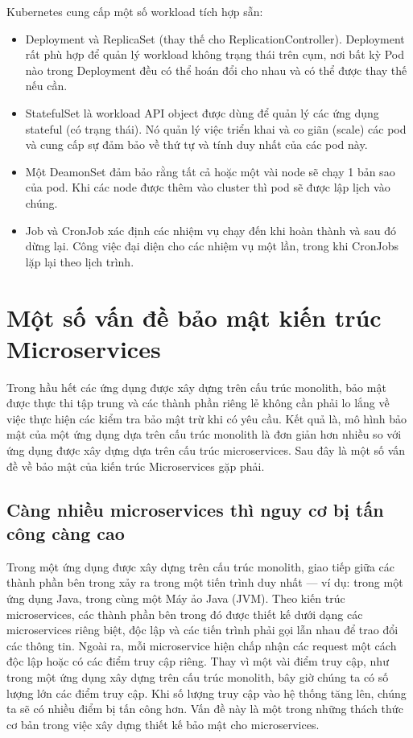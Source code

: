 \documentclass[12pt,a4paper]{report}
\begin{document}
				Kubernetes cung cấp một số workload tích hợp sẵn:
				\begin{itemize}				
					\item Deployment và ReplicaSet (thay thế cho ReplicationController). Deployment rất phù hợp để quản lý workload không trạng thái trên cụm, nơi bất kỳ Pod nào trong Deployment đều có thể hoán đổi cho nhau và có thể được thay thế nếu cần.
					\item StatefulSet là workload API object được dùng để quản lý các ứng dụng stateful (có trạng thái). Nó quản lý việc triển khai và co giãn (scale) các pod và cung cấp sự đảm bảo về thứ tự và tính duy nhất của các pod này.
					\item  Một DeamonSet đảm bảo rằng tất cả hoặc một vài node sẽ chạy 1 bản sao của pod. Khi các node được thêm vào cluster thì pod sẽ được lập lịch vào chúng.
					\item  Job và CronJob xác định các nhiệm vụ chạy đến khi hoàn thành và sau đó dừng lại. Công việc đại diện cho các nhiệm vụ một lần, trong khi CronJobs lặp lại theo lịch trình.
				\end{itemize}
		\section{Một số vấn đề bảo mật kiến trúc Microservices}
			{\hspace{0.6cm}Trong hầu hết các ứng dụng được xây dựng trên cấu trúc monolith, bảo mật được thực thi tập trung và các thành phần riêng lẻ không cần phải lo lắng về việc thực hiện các kiểm tra bảo mật trừ khi có yêu cầu. Kết quả là, mô hình bảo mật của một ứng dụng dựa trên cấu trúc monolith là đơn giản hơn nhiều so với ứng dụng được xây dựng dựa trên cấu trúc microservices. Sau đây là một số vấn đề về bảo mật của kiến trúc Microservices gặp phải.\\}			
			\subsection{Càng nhiều microservices thì nguy cơ bị tấn công càng cao}
				{\hspace{0.6cm}Trong một ứng dụng được xây dựng trên cấu trúc monolith, giao tiếp giữa các thành phần bên trong xảy ra trong một tiến trình duy nhất — ví dụ: trong một ứng dụng Java, trong cùng một Máy ảo Java (JVM). Theo kiến trúc microservices, các thành phần bên trong đó được thiết kế dưới dạng các microservices riêng biệt, độc lập và các tiến trình phải gọi lẫn nhau để trao đổi các thông tin. Ngoài ra, mỗi microservice hiện chấp nhận các request một cách độc lập hoặc có các điểm truy cập riêng. Thay vì một vài điểm truy cập, như trong một ứng dụng xây dựng trên cấu trúc monolith, bây giờ chúng ta có số lượng lớn các điểm truy cập. Khi số lượng truy cập vào hệ thống tăng lên, chúng ta sẽ có nhiều điểm bị tấn công hơn. Vấn đề này là một trong những thách thức cơ bản trong việc xây dựng thiết kế bảo mật cho microservices.\\}
\end{document}
